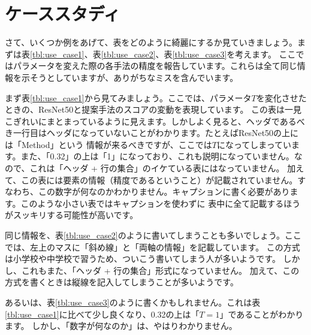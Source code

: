 \documentclass[uplatex,onecolumn,9pt,dvipdfmx]{jsarticle}
\newcommand{\Tref}[1]{表\ref{#1}}
\begin{document}
\section{ケーススタディ}

さて、いくつか例をあげて、表をどのように綺麗にするか見ていきましょう。まずは\Tref{tbl:use_case1}、\Tref{tbl:use_case2}、\Tref{tbl:use_case3}を考えます。
ここではパラメータを変えた際の各手法の精度を報告しています。これらは全て同じ情報を示そうとしていますが、ありがちなミスを含んでいます。

まず\Tref{tbl:use_case1}から見てみましょう。ここでは、パラメータ$T$を変化させたときの、ResNet50と提案手法のスコアの変動を表現しています。
この表は一見こぎれいにまとまっているように見えます。しかしよく見ると、ヘッダであるべき一行目はヘッダになっていないことがわかります。たとえばResNet50の上には「Method」という
情報が来るべきですが、ここでは$T$になってしまっています。また、「0.32」の上は「1」になっており、これも説明になっていません。なので、これは「ヘッダ + 行の集合」のイケている表にはなっていません。
加えて、この表には要素の情報（精度であるということ）が記載されていません。すなわち、この数字が何なのかわかりません。キャプションに書く必要があります。このような小さい表ではキャプションを使わずに
表中に全て記載するほうがスッキリする可能性が高いです。

同じ情報を、\Tref{tbl:use_case2}のように書いてしまうことも多いでしょう。ここでは、左上のマスに「斜め線」と「両軸の情報」を記載しています。
この方式は小学校や中学校で習うため、ついこう書いてしまう人が多いようです。
しかし、これもまた、「ヘッダ + 行の集合」形式になっていません。
加えて、この方式を書くときは縦線を記入してしまうことが多いようです。

あるいは、\Tref{tbl:use_case3}のように書くかもしれません。これは\Tref{tbl:use_case1}に比べて少し良くなり、0.32の上は「$T=1$」であることがわかります。
しかし、「数字が何なのか」は、やはりわかりません。
\end{document}
